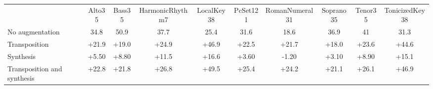 \begin{tabular}{lccccccccc}
                            & Alto35 & Bass35 & HarmonicRhythm7 & LocalKey38 & PcSet121 & RomanNumeral31 & Soprano35 & Tenor35 & TonicizedKey38 \\
No augmentation             & 34.8   & 50.9   & 37.7            & 25.4       & 31.6     & 18.6           & 36.9      & 41      & 31.3           \\
\hline
Transposition               & +21.9   & +19.0   & +24.9            & +46.9       & +22.5     & +21.7           & +18.0      & +23.6    & +44.6  \\
Synthesis                   & +5.50   & +8.80   & +11.5            & +16.6       & +3.60     & -1.20           & +3.10      & +8.90    & +15.1  \\
Transposition and synthesis & +22.8   & +21.8   & +26.8            & +49.5       & +25.4     & +24.2           & +21.1      & +26.1    & +46.9          
\end{tabular}
